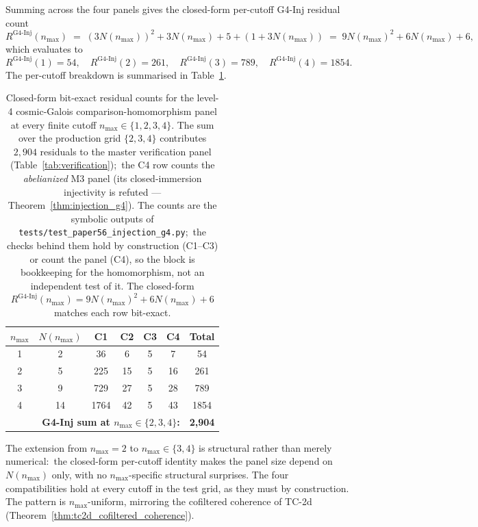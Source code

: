 \documentclass[11pt,a4paper]{article}
\theoremstyle{plain}
\theoremstyle{definition}
\newcommand{\nmax}{n_{\max}}
\begin{document}
Summing across the four panels gives the closed-form per-cutoff
G4-Inj residual count
\[
   R^{\mathrm{G4\text{-}Inj}}(\nmax)
   \;=\; (3 N(\nmax))^{2} + 3 N(\nmax) + 5 + (1 + 3 N(\nmax))
   \;=\; 9 N(\nmax)^{2} + 6 N(\nmax) + 6,
\]
which evaluates to
\[
   R^{\mathrm{G4\text{-}Inj}}(1) = 54, \quad
   R^{\mathrm{G4\text{-}Inj}}(2) = 261, \quad
   R^{\mathrm{G4\text{-}Inj}}(3) = 789, \quad
   R^{\mathrm{G4\text{-}Inj}}(4) = 1854.
\]
The per-cutoff breakdown is summarised in Table~\ref{tab:g4_inj_panel}.

\begin{table}[h]
\centering
\begin{tabular}{c c c c c c c}
\toprule
$\nmax$ & $N(\nmax)$ & C1 & C2 & C3 & C4 & Total \\
\midrule
1 & 2  & 36   & 6  & 5 & 7  & 54   \\
2 & 5  & 225  & 15 & 5 & 16 & 261  \\
3 & 9  & 729  & 27 & 5 & 28 & 789  \\
4 & 14 & 1764 & 42 & 5 & 43 & 1854 \\
\midrule
\multicolumn{6}{r}{\textbf{G4-Inj sum at $\nmax \in \{2, 3, 4\}$:}} & \textbf{2{,}904} \\
\bottomrule
\end{tabular}
\caption{Closed-form bit-exact residual counts for the level-4
cosmic-Galois comparison-homomorphism panel at every finite cutoff
$\nmax \in \{1, 2, 3, 4\}$. The sum over the production grid
$\{2, 3, 4\}$ contributes $2{,}904$ residuals to the master
verification panel (Table~\ref{tab:verification});\ the C4 row counts
the \emph{abelianized} M3 panel (its closed-immersion injectivity is
refuted --- Theorem~\ref{thm:injection_g4}). The counts are the
symbolic outputs of \texttt{tests/test\_paper56\_injection\_g4.py};\ the
checks behind them hold by construction (C1--C3) or count the panel
(C4), so the block is bookkeeping for the homomorphism, not an
independent test of it. The closed-form
$R^{\mathrm{G4\text{-}Inj}}(\nmax) = 9 N(\nmax)^{2} + 6 N(\nmax) + 6$
matches each row bit-exact.}
\label{tab:g4_inj_panel}
\end{table}

The extension from $\nmax = 2$ to $\nmax \in \{3, 4\}$ is structural
rather than merely numerical:\ the closed-form per-cutoff identity
makes the panel size depend on $N(\nmax)$ only, with no
$\nmax$-specific structural surprises. The four compatibilities hold
at every cutoff in the test grid, as they must by construction. The pattern is $\nmax$-uniform, mirroring the
cofiltered coherence of TC-2d
(Theorem~\ref{thm:tc2d_cofiltered_coherence}).
\end{document}
